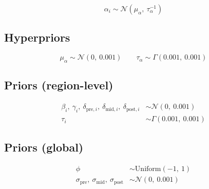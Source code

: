 \documentclass{article}
\begin{document}
\begin{equation}
  \alpha_i \sim \mathcal{N}(\mu_\alpha,\ \tau_\alpha^{-1})
\end{equation}

\subsection*{Hyperpriors}

\begin{equation}
  \mu_\alpha \sim \mathcal{N}(0,\ 0.001) \qquad \tau_\alpha \sim \Gamma(0.001,\ 0.001)
\end{equation}

\subsection*{Priors (region-level)}

\begin{align}
  \beta_i,\ \gamma_i,\ \delta_{\text{pre},i},\ \delta_{\text{mid},i},\ \delta_{\text{post},i} &\sim \mathcal{N}(0,\ 0.001) \\
  \tau_i &\sim \Gamma(0.001,\ 0.001)
\end{align}

\subsection*{Priors (global)}

\begin{align}
  \phi &\sim \mathrm{Uniform}(-1,\ 1) \\
  \sigma_{\text{pre}},\ \sigma_{\text{mid}},\ \sigma_{\text{post}} &\sim \mathcal{N}(0,\ 0.001)
\end{align}
\end{document}
